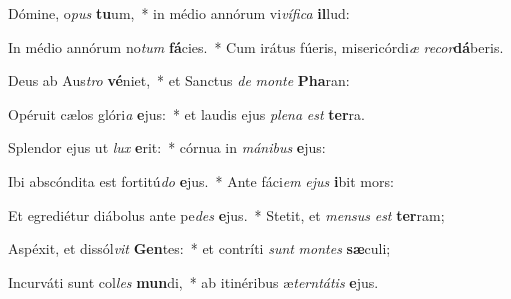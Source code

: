\item Dómine, o\textit{pus} \textbf{tu}um,~* in médio annórum vi\textit{ví}\textit{fi}\textit{ca} \textbf{il}lud:
\item In médio annórum no\textit{tum} \textbf{fá}cies.~* Cum irátus fúeris, misericórdi\textit{æ} \textit{re}\textit{cor}\textbf{dá}beris.
\item Deus ab Aus\textit{tro} \textbf{vé}niet,~* et Sanctus \textit{de} \textit{mon}\textit{te} \textbf{Pha}ran:
\item Opéruit cælos glóri\textit{a} \textbf{e}jus:~* et laudis ejus \textit{ple}\textit{na} \textit{est} \textbf{ter}ra.
\item Splendor ejus ut \textit{lux} \textbf{e}rit:~* córnua in \textit{má}\textit{ni}\textit{bus} \textbf{e}jus:
\item Ibi abscóndita est fortitú\textit{do} \textbf{e}jus.~* Ante fáci\textit{em} \textit{e}\textit{jus} \textbf{i}bit mors:
\item Et egrediétur diábolus ante pe\textit{des} \textbf{e}jus.~* Stetit, et \textit{men}\textit{sus} \textit{est} \textbf{ter}ram;
\item Aspéxit, et dissól\textit{vit} \textbf{Gen}tes:~* et contríti \textit{sunt} \textit{mon}\textit{tes} \textbf{sæ}culi;
\item Incurváti sunt col\textit{les} \textbf{mun}di,~* ab itinéribus æ\textit{tern}\textit{tá}\textit{tis} \textbf{e}jus.
